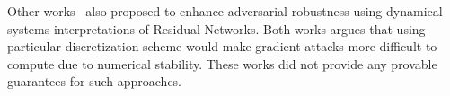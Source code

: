 Other works~\citep{huang2020adversarial,li2020implicit} also proposed to enhance adversarial robustness using dynamical systems interpretations of Residual Networks. Both works argues that using particular discretization scheme would make gradient attacks more difficult to compute due to numerical stability. These works did not provide any provable guarantees for such approaches.



